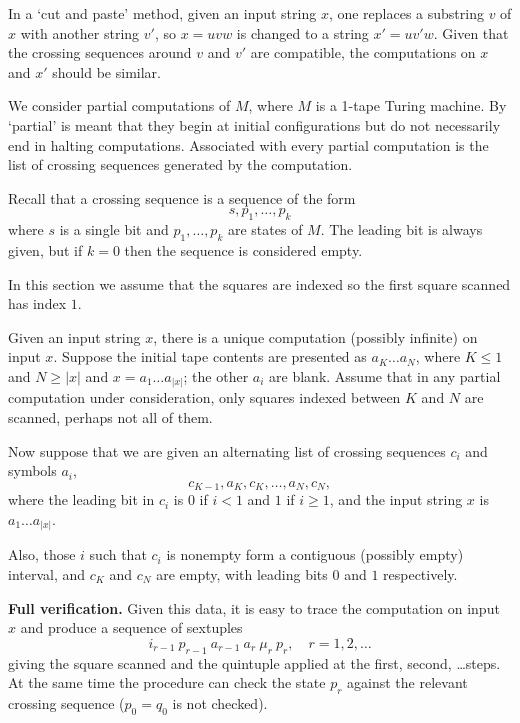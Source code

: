 \def\labelitemii{$\diamond$}
\newcommand{\next}{N}
\newcommand{\nextstate}{{\mbox{\rm Nustate}}}


In a
`cut and paste' method, given an input string $x$,
one replaces a substring $v$ of $x$ with another
string $v'$, so $x=uvw$ is changed to a string $x' = uv'w$.
Given that the crossing sequences around $v$ and $v'$
are compatible, the computations on $x$ and $x'$ should be similar.


We consider partial computations of $M$,
where $M$ is a 1-tape Turing machine.
By `partial' is meant that they begin at initial configurations
but do not necessarily end in halting computations.
Associated with every partial computation
is the list of crossing sequences generated by
the computation.

Recall that a crossing sequence is a sequence of the form
$$ s, p_1, \ldots, p_k $$ where $s$ is a single bit
and $p_1,\ldots, p_k$ are states of $M$.  The leading bit
is always given, but if $k=0$ then the sequence is considered empty.

In this section we assume that the squares are indexed
so the first square scanned has index $1$.

\numpara
\label{par: alternating list}
Given an input string $x$,
there is a unique computation (possibly infinite) on input $x$.
Suppose the initial tape contents are presented as
$a_{K}\ldots a_N$, where $K \leq 1$
and $N \geq |x|$ and $x = a_1 \ldots a_{|x|}$;
the other $a_i$ are blank.
Assume that in any partial computation under consideration,
only squares indexed between $K$ and $N$ are
scanned, perhaps not all of them.

\numpara
\label{par: specification}
Now suppose that we are given an alternating list
of crossing sequences $c_i$ and symbols $a_i$,
\begin{equation}
\label{given data}
c_{K-1} , a_K, c_K, \ldots, a_N, c_N,
\end{equation} where
the leading bit in $c_i$ is $0$ if $i < 1$ and $1$ if $i\geq 1$,
and the input string $x$ is $a_1\ldots a_{|x|}$.

Also, those $i$ such that $c_i$ is nonempty
form a contiguous (possibly empty) interval,
and $c_K$ and $c_N$ are empty, with leading
bits $0$ and $1$ respectively.

\numpara
\label{par: full verification}
{\bf Full verification.}
Given this data, it is easy to trace the computation
on input $x$ and produce a sequence of sextuples
$$ i_{r-1}~ p_{r-1}~ a_{r-1} ~ a_r~ \mu_r~ p_r,
\quad r = 1,2,\ldots $$ giving the square scanned
and the quintuple applied at the first, second, \ldots steps.
At the same time the procedure can check the state $p_r$ against
the relevant crossing sequence ($p_0 = q_0$ is not checked).

